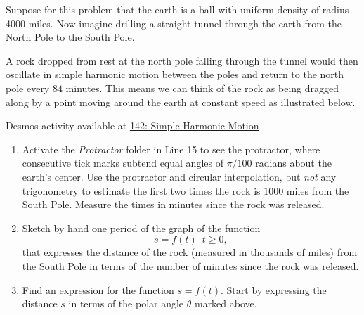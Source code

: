 \documentclass{ximera}
\begin{document}
\begin{question}  \label{QKLKLddfgkghg}
Suppose for this problem that the earth is a ball with uniform density of radius 4000 miles. Now imagine drilling a straight tunnel through the earth from the North Pole to the South Pole. 

A rock dropped from rest at the north pole falling through the tunnel would then oscillate in simple harmonic motion between the poles and return to the north pole every $84$ minutes. This means we can think of the rock as being dragged along by a point moving around the earth at constant speed as illustrated below. 

\begin{onlineOnly}
    \begin{center}
\end{center}
\end{onlineOnly}

Desmos activity available at \href{https://www.desmos.com/calculator/ij8dqowgza}{142: Simple Harmonic Motion}

\begin{enumerate}

\item Activate the \emph{Protractor} folder in Line 15 to see the protractor, where consecutive tick marks subtend equal angles of $\pi/100$ radians about the earth's center. Use the protractor and circular interpolation, but \emph{not} any trigonometry to estimate the first two times the rock is $1000$ miles from the South Pole. Measure the times in minutes since the rock was released. 



\item Sketch by hand one period of the graph of the function
\[
 s = f(t) \, \, \, t\geq 0 ,
\]
that expresses the distance of the rock (measured in thousands of miles) from the South Pole in terms of the number of minutes since the rock was released. %

\item Find an expression for the function $s=f(t)$. Start by expressing the distance $s$ in terms of the polar angle $\theta$ marked above.


\end{enumerate}
\end{question}
\end{document}
